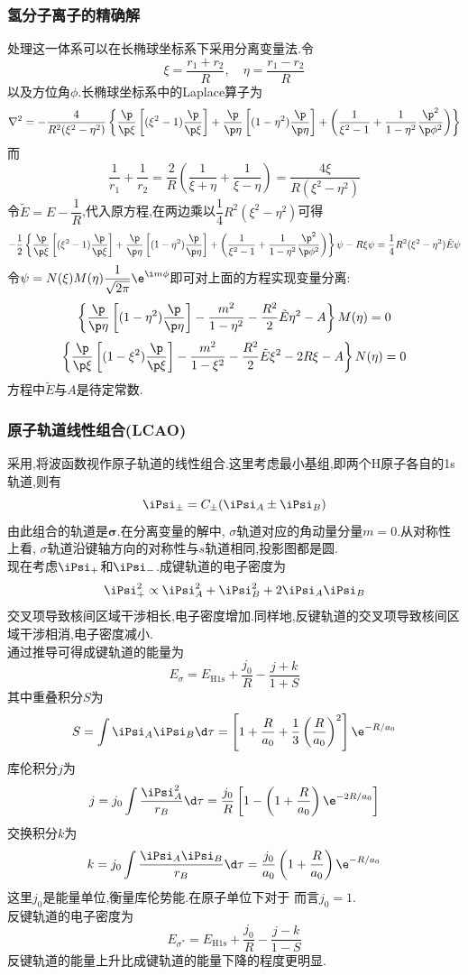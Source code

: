 \documentclass{ctexbook}
\begin{document}
\subsubsection{氢分子离子的精确解}
处理这一体系可以在长椭球坐标系下采用分离变量法.令
\[\xi=\dfrac{r_1+r_2}{R},\quad\eta=\dfrac{r_1-r_2}{R}\]
以及方位角$\phi$.长椭球坐标系中的Laplace算子为
\[\nabla^2=-\dfrac{4}{R^2(\xi^2-\eta^2)}\left\{\dfrac{\p}{\p\xi}\left[(\xi^2-1)\dfrac{\p}{\p\xi}\right]+\dfrac{\p}{\p\eta}\left[(1-\eta^2)\dfrac{\p}{\p\eta}\right]+\left(\dfrac{1}{\xi^2-1}+\dfrac{1}{1-\eta^2}\dfrac{\p^2}{\p\phi^2}\right)\right\}\]
而
\[\dfrac{1}{r_1}+\dfrac{1}{r_2}=\dfrac{2}{R}\left(\dfrac{1}{\xi+\eta}+\dfrac{1}{\xi-\eta}\right)=\dfrac{4\xi}{R(\xi^2-\eta^2)}\]
令$\tilde{E}=E-\dfrac1R$,代入原方程,在两边乘以$\dfrac14R^2(\xi^2-\eta^2)$可得
\[-\dfrac12\left\{\dfrac{\p}{\p\xi}\left[(\xi^2-1)\dfrac{\p}{\p\xi}\right]+\dfrac{\p}{\p\eta}\left[(1-\eta^2)\dfrac{\p}{\p\eta}\right]+\left(\dfrac{1}{\xi^2-1}+\dfrac{1}{1-\eta^2}\dfrac{\p^2}{\p\phi^2}\right)\right\}\psi-R\xi\psi=\dfrac14R^2(\xi^2-\eta^2)\tilde{E}\psi\]
令$\psi=N(\xi)M(\eta)\dfrac{1}{\sqrt{2\pi}}\e^{\i m\phi}$即可对上面的方程实现变量分离:
\[\left\{\dfrac{\p}{\p\eta}\left[(1-\eta^2)\dfrac{\p}{\p\eta}\right]-\dfrac{m^2}{1-\eta^2}-\dfrac{R^2}{2}\tilde{E}\eta^2-A\right\}M(\eta)=0\]
\[\left\{\dfrac{\p}{\p\xi}\left[(1-\xi^2)\dfrac{\p}{\p\xi}\right]-\dfrac{m^2}{1-\xi^2}-\dfrac{R^2}{2}\tilde{E}\xi^2-2R\xi-A\right\}N(\eta)=0\]
方程中$\tilde{E}$与$A$是待定常数.
\subsubsection{原子轨道线性组合(LCAO)}
采用,将波函数视作原子轨道的线性组合.这里考虑最小基组,即两个H原子各自的1s轨道,则有
\[\iPsi_{\pm}=C_{\pm}(\iPsi_A\pm\iPsi_B)\]
由此组合的轨道是$\symbf\sigma$.在分离变量的解中, $\sigma$轨道对应的角动量分量$m=0$.从对称性上看, $\sigma$轨道沿键轴方向的对称性与$s$轨道相同,投影图都是圆.\\
\indent 现在考虑$\iPsi_+$和$\iPsi_{-}$.成键轨道的电子密度为
\[\iPsi_+^2\propto\iPsi_A^2+\iPsi_B^2+2\iPsi_A\iPsi_B\]
交叉项导致核间区域干涉相长,电子密度增加.同样地,反键轨道的交叉项导致核间区域干涉相消,电子密度减小.\\
\indent 通过推导可得成键轨道的能量为
\[E_\sigma=E_{\text{H}1\text{s}}+\dfrac{j_0}{R}-\dfrac{j+k}{1+S}\]
其中重叠积分$S$为
\[S=\int\iPsi_A\iPsi_B\d\tau=\left[1+\dfrac{R}{a_0}+\dfrac13\left(\dfrac{R}{a_0}\right)^2\right]\e^{-R/a_0}\]
库伦积分$j$为
\[j=j_0\int\dfrac{\iPsi_A^2}{r_B}\d\tau=\dfrac{j_0}{R}\left[1-\left(1+\dfrac{R}{a_0}\right)\e^{-2R/a_0}\right]\]
交换积分$k$为
\[k=j_0\int\dfrac{\iPsi_A\iPsi_B}{r_B}\d\tau=\dfrac{j_0}{a_0}\left(1+\dfrac{R}{a_0}\right)\e^{-R/a_0}\]
这里$j_0$是能量单位,衡量库伦势能.在原子单位下对于 而言$j_0=1$.\\
\indent 反键轨道的电子密度为
\[E_{\sigma^\ast}=E_{\text{H}1\text{s}}+\dfrac{j_0}{R}-\dfrac{j-k}{1-S}\]
反键轨道的能量上升比成键轨道的能量下降的程度更明显.
\end{document}

